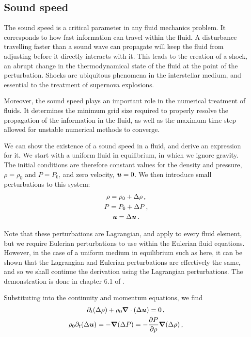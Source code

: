 \subsection{Sound speed} \label{sec:fluid_sound}

The sound speed is a critical parameter in any fluid mechanics problem. It corresponds to how fast information can travel within the fluid. A disturbance travelling faster than a sound wave can propagate will keep the fluid from adjusting before it directly interacts with it. This leads to the creation of a shock, an abrupt change in the thermodynamical state of the fluid at the point of the perturbation. Shocks are ubiquitous phenomena in the interstellar medium, and essential to the treatment of supernova explosions.

Moreover, the sound speed plays an important role in the numerical treatment of fluids. It determines the minimum grid size required to properly resolve the propagation of the information in the fluid, as well as the maximum time step allowed for unstable numerical methods to converge.

We can show the existence of a sound speed in a fluid, and derive an expression for it. We start with a uniform fluid in equilibrium, in which we ignore gravity. The initial conditions are therefore constant values for the density and pressure, \(\rho = \rho_0\) and \(P = P_0\), and zero velocity, \(\boldsymbol{u} = 0\). We then introduce small perturbations to this system:
\begin{gather}
    \rho = \rho_0 + \Delta \rho \label{eq:dens_perturb} \,\mathrm{,} \\
    P = P_0 + \Delta P \label{eq:pres_perturb} \,\mathrm{,} \\
    \boldsymbol{u} = \Delta \boldsymbol{u} \label{eq:vel_perturb} \,\mathrm{.}
\end{gather}

Note that these perturbations are Lagrangian, and apply to every fluid element, but we require Eulerian perturbations to use within the Eulerian fluid equations. However, in the case of a uniform medium in equilibrium such as here, it can be shown that the Lagrangian and Eulerian perturbations are effectively the same, and so we shall continue the derivation using the Lagrangian perturbations. The demonstration is done in chapter 6.1 of \cite{Clarke2007}.

Substituting  into the continuity and momentum equations, we find
\begin{gather}
    \partial_t (\Delta \rho) + \rho_0 \boldsymbol{\nabla} \cdot (\Delta \boldsymbol{u}) = 0 \,\mathrm{,} \label{eq:sound_int1} \\
    \rho_0 \partial_t (\Delta \boldsymbol{u}) = - \boldsymbol{\nabla} (\Delta P) = - \frac{\partial P}{\partial \rho} \boldsymbol{\nabla} (\Delta \rho) \,\mathrm{,} \label{eq:sound_int2}
\end{gather}

